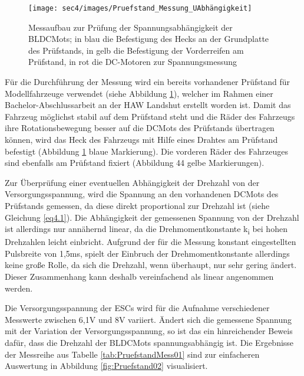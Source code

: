\begin{figure}[H] %
\texttt{[image: sec4/images/Pruefstand\_Messung\_UAbhängigkeit]} 
\centering
\captionsetup{width=.95\textwidth}
\caption[Messaufbau zur Prüfung der Spannungsabhängigkeit der \acp{BLDCMot}]{Messaufbau zur Prüfung der Spannungsabhängigkeit der \acp{BLDCMot}; in blau die Befestigung des Hecks an der Grundplatte des Prüfstands, in gelb die Befestigung der Vorderreifen am Prüfstand, in rot die DC-Motoren zur Spannungsmessung}\centering
\label{fig:Pruefstand01}
\end{figure}

Für die Durchführung der Messung wird ein bereits vorhandener Prüfstand für Modellfahrzeuge verwendet (siehe Abbildung \ref{fig:Pruefstand01}), welcher im Rahmen einer Bachelor-Abschlussarbeit an der HAW Landshut erstellt worden ist. Damit das Fahrzeug möglichst stabil auf dem Prüfstand steht und die Räder des Fahrzeugs ihre Rotationsbewegung besser auf die \acp{DCMot} des Prüfstands übertragen können, wird das Heck des Fahrzeugs mit Hilfe eines Drahtes am Prüfstand befestigt (Abbildung \ref{fig:Pruefstand01} blaue Markierung). Die vorderen Räder des Fahrzeuges sind ebenfalls am Prüfstand fixiert (Abbildung 44 gelbe Markierungen). \vspace{11pt}

Zur Überprüfung einer eventuellen Abhängigkeit der Drehzahl von der Versorgungsspannung, wird die Spannung an den vorhandenen \acp{DCMot} des Prüfstands gemessen, da diese direkt proportional zur Drehzahl ist (siehe Gleichung \ref{eq4.1}). Die Abhängigkeit der gemessenen Spannung von der Drehzahl ist allerdings nur annähernd linear, da die Drehmomentkonstante k\textsubscript{i} bei hohen Drehzahlen leicht einbricht. Aufgrund der für die Messung konstant eingestellten Pulsbreite von 1,5ms, spielt der Einbruch der Drehmomentkonstante allerdings keine große Rolle, da sich die Drehzahl, wenn überhaupt, nur sehr gering ändert. Dieser Zusammenhang kann deshalb vereinfachend als linear angenommen werden.\vspace{11pt}

Die Versorgungsspannung der \acp{ESC} wird für die Aufnahme verschiedener Messwerte zwischen 6,1V und 8V variiert. Ändert sich die gemessene Spannung mit der Variation der Versorgungsspannung, so ist das ein hinreichender Beweis dafür, dass die Drehzahl der \acp{BLDCMot} spannungsabhängig ist. Die Ergebnisse der Messreihe aus Tabelle \ref{tab:PruefstandMess01} sind zur einfacheren Auswertung in Abbildung \ref{fig:Pruefstand02} visualisiert.

